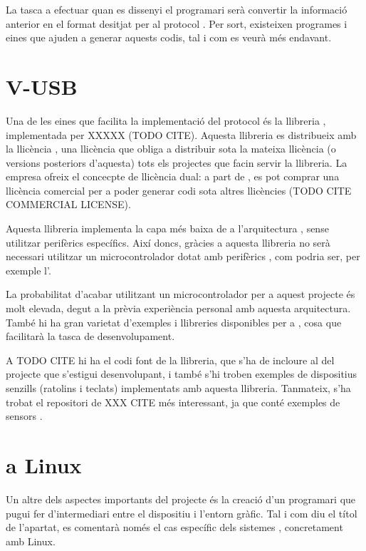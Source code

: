La tasca a efectuar quan es dissenyi el programari serà convertir la
informació anterior en el format desitjat per al protocol . Per sort,
existeixen programes i eines que ajuden a generar aquests codis, tal i com
es veurà més endavant.

\section{V-USB}

Una de les eines que facilita la implementació del protocol  és la
llibreria , implementada per XXXXX (TODO CITE). Aquesta llibreria
es distribueix amb la llicència , una llicència que obliga a
distribuir sota la mateixa llicència (o versions posteriors d'aquesta) tots els
projectes que facin servir la llibreria. La empresa ofreix el concecpte de
llicència dual: a part de , es pot comprar una llicència comercial
per a poder generar codi sota altres llicències (TODO CITE COMMERCIAL LICENSE).

Aquesta llibreria implementa la capa més baixa de  a l'arquitectura
, sense utilitzar perifèrics específics. Així doncs, gràcies a aquesta
llibreria no serà necessari utilitzar un microcontrolador  dotat amb
perifèrics , com podria ser, per exemple l'.

La probabilitat d'acabar utilitzant un microcontrolador  per a aquest
projecte és molt elevada, degut a la prèvia experiència personal amb aquesta
arquitectura. També hi ha gran varietat d'exemples i llibreries disponibles per
a , cosa que facilitarà la tasca de desenvolupament.

A TODO CITE hi ha el codi font de la llibreria, que s'ha de incloure al del
projecte que s'estigui desenvolupant, i també s'hi troben exemples de dispositius
senzills (ratolins i teclats) implementats amb aquesta llibreria. Tanmateix,
s'ha trobat el repositori de XXX CITE més interessant, ja que conté exemples
de sensors .

\section{ a Linux}

Un altre dels aspectes importants del projecte és la creació d'un programari
que pugui fer d'intermediari entre el dispositiu i l'entorn gràfic. Tal i com
diu el títol de l'apartat, es comentarà només el cas específic dels sistemes
, concretament amb Linux.

